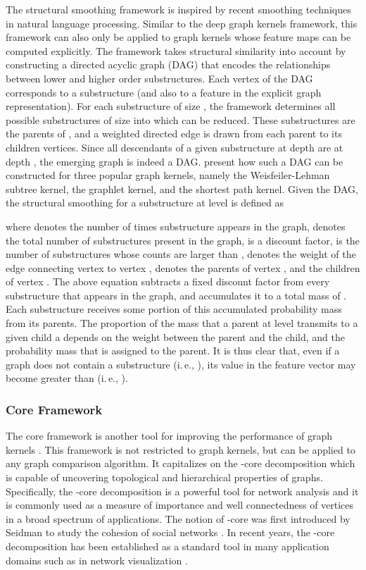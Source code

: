 \documentclass[twoside,11pt]{article}
\newcommand{\ie}{i.\,e., }
\begin{document}
The structural smoothing framework is inspired by recent smoothing techniques in natural language processing.
Similar to the deep graph kernels framework, this framework can also only be applied to graph kernels whose feature maps  can be computed explicitly.
The framework takes structural similarity into account by constructing a directed acyclic graph (DAG) that encodes the relationships between lower and higher order substructures.
Each vertex of the DAG corresponds to a substructure (and also to a feature in the explicit graph representation).
For each substructure  of size , the framework determines all possible substructures of size  into which  can be reduced.
These substructures are the parents of , and a weighted directed edge is drawn from each parent to its children vertices.
Since all descendants of a given substructure at depth  are at depth , the emerging graph is indeed a DAG.
 present how such a DAG can be constructed for three popular graph kernels, namely the Weisfeiler-Lehman subtree kernel, the graphlet kernel, and the shortest path kernel.
Given the DAG, the structural smoothing for a substructure  at level  is defined as

where  denotes the number of times substructure  appears in the graph,  denotes the total number of substructures present in the graph,  is a discount factor,  is the number of substructures whose counts are larger than ,  denotes the weight of the edge connecting vertex  to vertex ,  denotes the parents of vertex , and  the children of vertex .
The above equation subtracts a fixed discount factor  from every substructure that appears in the graph, and accumulates it to a total mass of .
Each substructure  receives some portion of this accumulated probability mass from its parents.
The proportion of the mass that a parent  at level  transmits to a given child a depends on the weight  between the parent and the child, and the probability mass  that is assigned to the parent.
It is thus clear that, even if a graph does not contain a substructure  (\ie ), its value in the feature vector may become greater than  (\ie ).

\subsubsection{Core Framework}
The core framework is another tool for improving the performance of graph kernels .
This framework is not restricted to graph kernels, but can be applied to any graph comparison algorithm.
It capitalizes on the -core decomposition which is capable of uncovering topological and hierarchical properties of graphs.
Specifically, the -core decomposition is a powerful tool for network analysis and it is commonly used as a measure of importance and well connectedness of vertices in a broad spectrum of applications.
The notion of -core was first introduced by Seidman to study the cohesion of social networks .
In recent years, the -core decomposition has been established as a standard tool in many application domains such as in network visualization .
\end{document}
